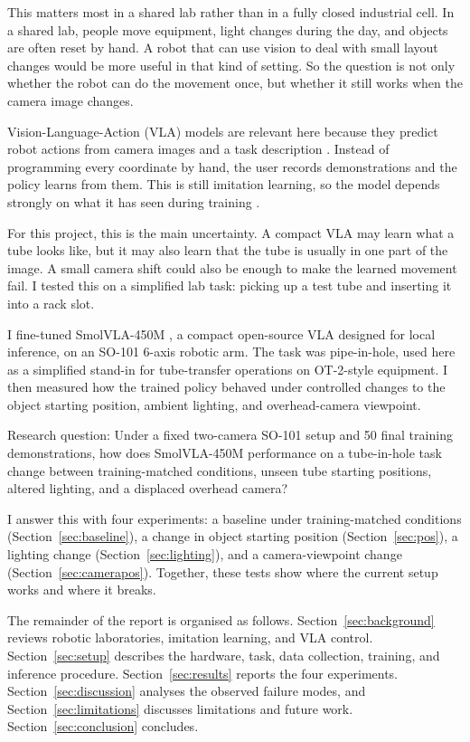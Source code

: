 \documentclass[11pt, a4paper]{article}
\begin{document}
This matters most in a shared lab rather than in a fully closed industrial cell. In a shared lab, people move equipment, light changes during the day, and objects are often reset by hand. A robot that can use vision to deal with small layout changes would be more useful in that kind of setting. So the question is not only whether the robot can do the movement once, but whether it still works when the camera image changes.

Vision-Language-Action (VLA) models are relevant here because they predict robot actions from camera images and a task description \parencite{brohan2023rt1, zitkovich2023rt2, shukor2025smolvla}. Instead of programming every coordinate by hand, the user records demonstrations and the policy learns from them. This is still imitation learning, so the model depends strongly on what it has seen during training \parencite{hussein2017imitation, ross2011dagger}.

For this project, this is the main uncertainty. A compact VLA may learn what a tube looks like, but it may also learn that the tube is usually in one part of the image. A small camera shift could also be enough to make the learned movement fail. I tested this on a simplified lab task: picking up a test tube and inserting it into a rack slot.

I fine-tuned SmolVLA-450M \parencite{shukor2025smolvla}, a compact open-source VLA designed for local inference, on an SO-101 6-axis robotic arm. The task was pipe-in-hole, used here as a simplified stand-in for tube-transfer operations on OT-2-style equipment. I then measured how the trained policy behaved under controlled changes to the object starting position, ambient lighting, and overhead-camera viewpoint.

Research question: Under a fixed two-camera SO-101 setup and 50 final training demonstrations, how does SmolVLA-450M performance on a tube-in-hole task change between training-matched conditions, unseen tube starting positions, altered lighting, and a displaced overhead camera?

I answer this with four experiments: a baseline under training-matched conditions (Section~\ref{sec:baseline}), a change in object starting position (Section~\ref{sec:pos}), a lighting change (Section~\ref{sec:lighting}), and a camera-viewpoint change (Section~\ref{sec:camerapos}). Together, these tests show where the current setup works and where it breaks.

The remainder of the report is organised as follows. Section~\ref{sec:background} reviews robotic laboratories, imitation learning, and VLA control. Section~\ref{sec:setup} describes the hardware, task, data collection, training, and inference procedure. Section~\ref{sec:results} reports the four experiments. Section~\ref{sec:discussion} analyses the observed failure modes, and Section~\ref{sec:limitations} discusses limitations and future work. Section~\ref{sec:conclusion} concludes.
\end{document}
